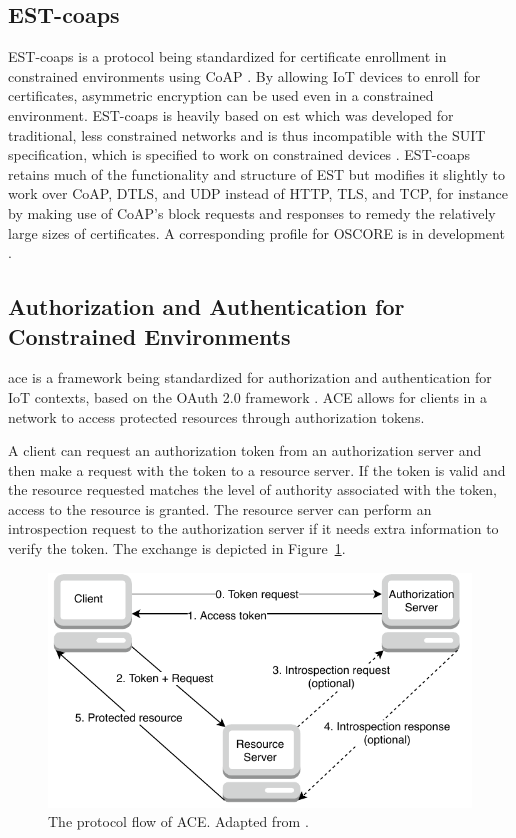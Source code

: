 \documentclass[0-thesis.tex]{subfiles}
\begin{document}
\subsection{EST-coaps}
\label{ssec:est-coaps}
EST-coaps is a protocol being standardized for certificate enrollment in constrained
environments using CoAP \parencite{est-coaps}. By allowing IoT devices to enroll for
certificates, asymmetric encryption can be used even in a constrained environment.
EST-coaps is heavily based on \gls{est} which was developed for traditional, less
constrained networks and is thus incompatible with the SUIT specification, which is
specified to work on constrained devices \parencite{rfc7030}. EST-coaps retains much of
the functionality and structure of EST but modifies it slightly to work over CoAP, DTLS,
and UDP instead of HTTP, TLS, and TCP, for instance by making use of CoAP's block requests
and responses to remedy the relatively large sizes of certificates. A corresponding
profile for OSCORE is in development \parencite{est-oscore}.

\subsection{Authorization and Authentication for Constrained Environments}
\label{ssec:ace}
\gls{ace} is a framework being standardized for authorization and authentication for IoT
contexts, based on the OAuth 2.0 framework \parencite{ace}. ACE allows for clients in a
network to access protected resources through authorization tokens. 

A client can request an authorization token from an authorization server and then make a
request with the token to a resource server. If the token is valid and the resource
requested matches the level of authority associated with the token, access to the resource
is granted. The resource server can perform an introspection request to the authorization
server if it needs extra information to verify the token. The exchange is depicted in
Figure~\ref{fig:ace-flow}.

\begin{figure}
    \caption{The protocol flow of ACE. Adapted from \parencite{ace}.}
    \label{fig:ace-flow}
    \includegraphics{images/ace.pdf}
\end{figure}
\end{document}
